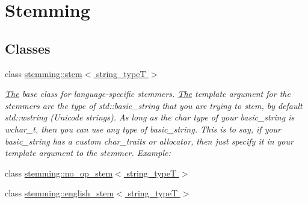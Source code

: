 \hypertarget{group___stemming}{\section{Stemming}
\label{group___stemming}
}
\subsection*{Classes}
\begin{DoxyCompactItemize}
\item 
class \hyperlink{classstemming_1_1stem}{stemming\-::stem$<$ string\-\_\-type\-T $>$}
\begin{DoxyCompactList}\small\item\em \hyperlink{class_the}{The} base class for language-\/specific stemmers. \hyperlink{class_the}{The} template argument for the stemmers are the type of std\-::basic\-\_\-string that you are trying to stem, by default std\-::wstring (Unicode strings). As long as the char type of your basic\-\_\-string is wchar\-\_\-t, then you can use any type of basic\-\_\-string. This is to say, if your basic\-\_\-string has a custom char\-\_\-traits or allocator, then just specify it in your template argument to the stemmer. Example\-: \end{DoxyCompactList}\item 
class \hyperlink{classstemming_1_1no__op__stem}{stemming\-::no\-\_\-op\-\_\-stem$<$ string\-\_\-type\-T $>$}
\item 
class \hyperlink{classstemming_1_1english__stem}{stemming\-::english\-\_\-stem$<$ string\-\_\-type\-T $>$}
\end{DoxyCompactItemize}
